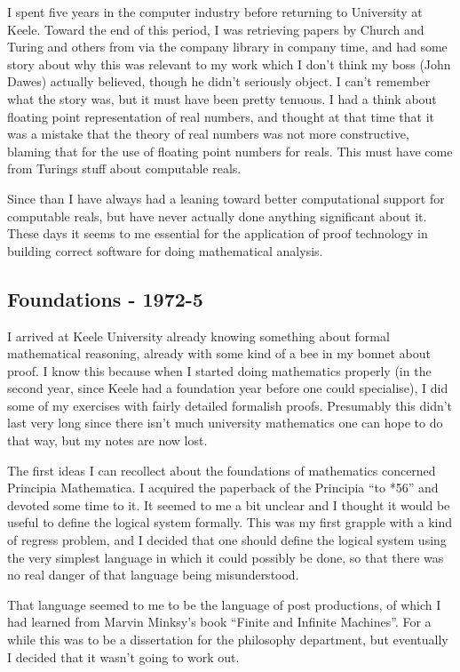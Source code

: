 \documentclass{rbjk}
\begin{document}
\begin{article}
I spent five years in the computer industry before returning to University at Keele.
Toward the end of this period, I was retrieving papers by Church and Turing and others from via the company library in company time, and had some story about why this was relevant to my work which I don't think my boss (John Dawes) actually believed, though he didn't seriously object.
I can't remember what the story was, but it must have been pretty tenuous.
I had a think about floating point representation of real numbers, and thought at that time that it was a mistake that the theory of real numbers was not more constructive, blaming that for the use of floating point numbers for reals.
This must have come from Turings stuff about computable reals.

Since than I have always had a leaning toward better computational support for computable reals, but have never actually done anything significant about it.
These days it seems to me essential for the application of proof technology in building correct software for doing mathematical analysis.

\subsection{Foundations - 1972-5}

I arrived at Keele University already knowing something about formal mathematical reasoning, already with some kind of a bee in my bonnet about proof.
I know this because when I started doing mathematics properly (in the second year, since Keele had a foundation year before one could specialise), I did some of my exercises with fairly detailed formalish proofs.
Presumably this didn't last very long since there isn't much university mathematics one can hope to do that way, but my notes are now lost.

The first ideas I can recollect about the foundations of mathematics concerned Principia Mathematica.
I acquired the paperback of the Principia ``to *56'' and devoted some time to it.
It seemed to me a bit unclear and I thought it would be useful to define the logical system formally.
This was my first grapple with a kind of regress problem, and I decided that one should define the logical system using the very simplest language in which it could possibly be done, so that there was no real danger of that language being misunderstood.

That language seemed to me to be the language of post productions, of which I had learned from Marvin Minksy's book ``Finite and Infinite Machines''.
For a while this was to be a dissertation for the philosophy department, but eventually I decided that it wasn't going to work out.


\end{article}
\end{document}
